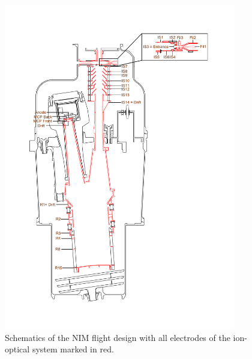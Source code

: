 	\begin{figure}[h!]
		\centering
		\includegraphics[width= 0.9\textwidth]{Setup/NIM_schema.pdf}
		\caption{Schematics of the NIM flight design with all electrodes of the ion-optical system marked in red.}
		\label{fig:MINPFMTot}
	\end{figure}
